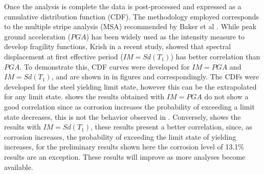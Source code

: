 Once the analysis is complete the data is post-processed and expressed as a cumulative distribution function (CDF). The methodology employed corresponds to the multiple stripe analysis (MSA) recommended by Baker et al \cite{Baker2015}. While peak ground acceleration ($PGA$) has been widely used as the intensity measure to develop fragility functions\cite{Ghosh2015}\cite{Bisadi2015}\cite{Shekhar2018}, Krish \cite{Krish2018} in a recent study, showed that spectral displacement at first effective period ($IM=Sd(T_1)$) has better correlation than $PGA$. To demonstrate this, CDF curves were developed for $IM=PGA$ and $IM=Sd(T_1)$, and are shown in in figures  and  correspondingly. The CDFs were developed for the steel yielding limit state, however this can be the extrapolated for any limit state.  shows the results obtained with $IM=PGA$ do not show a good correlation since as corrosion increases the probability of exceeding a limit state decreases, this is not the behavior observed in . Conversely,  shows the results with $IM=Sd(T_1)$, these results present a better correlation, since, as corrosion increases, the probability of exceeding the limit state of yielding increases, for the preliminary results shown here the corrosion level of 13.1\% results are an exception. These results will improve as more analyses become available. 

